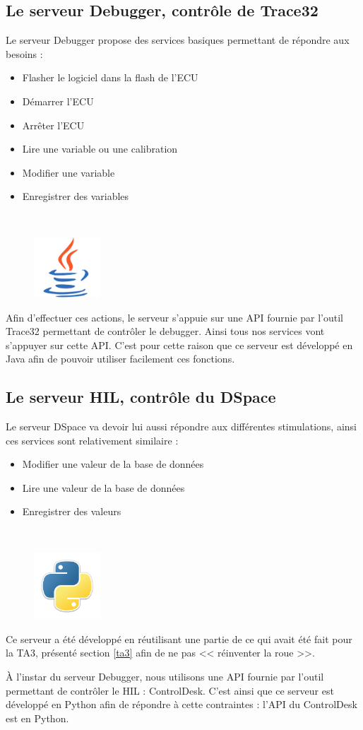 \subsection{Le serveur Debugger, contrôle de Trace32}
Le serveur Debugger propose des services basiques permettant de répondre aux besoins :
\begin{itemize}
	\item Flasher le logiciel dans la flash de l'ECU
	\item Démarrer l'ECU
	\item Arrêter l'ECU
	\item Lire une variable ou une calibration
	\item Modifier une variable
	\item Enregistrer des variables
\end{itemize}~

\begin{figure}
	\vspace{-40px}
	\includegraphics[width=2.5cm]{contents/images/logoJava.png}
\end{figure}
Afin d'effectuer ces actions, le serveur s'appuie sur une API fournie par l'outil Trace32 permettant de contrôler le debugger. Ainsi tous nos services vont s'appuyer sur cette API. C'est pour cette raison que ce serveur est développé en Java afin de pouvoir utiliser
facilement ces fonctions.

\subsection{Le serveur HIL, contrôle du DSpace}
Le serveur DSpace va devoir lui aussi répondre aux différentes stimulations, ainsi ces services sont relativement similaire : 
\begin{itemize}
	\item Modifier une valeur de la base de données
	\item Lire une valeur de la base de données
	\item Enregistrer des valeurs
\end{itemize}~

\begin{figure}
	\includegraphics[width=2.5cm]{contents/images/python.png}
\end{figure}
Ce serveur a été développé en réutilisant une partie de ce qui avait été fait pour la TA3, présenté section \ref{ta3} afin de ne pas
<< réinventer la roue >>. 

À l'instar du serveur Debugger, nous utilisons une API fournie par l'outil permettant de contrôler le HIL : ControlDesk. 
C'est ainsi que ce serveur est développé en Python afin de répondre à cette contraintes : l'API du ControlDesk est en Python.


